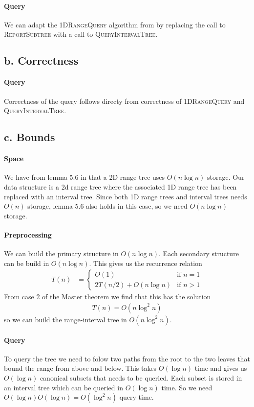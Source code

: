 \documentclass[10pt,a4paper,final,oneside,openany,article,oldfontcommands]{memoir}
\newcommand{\twopartdef}[4] {
  \left\{
    \begin{array}{ll}
      #1 & \mbox{if } #2 \\
      {#3} & \mbox{if } #4
    \end{array}
  \right.
}
\begin{document}
\paragraph{Query}
We can adapt the \textsc{ 1DRangeQuery} algorithm from \cite{deBerg} by replacing the call to \textsc{ ReportSubtree} with a call to \textsc{ QueryIntervalTree}.


\subsection*{b. Correctness}
\paragraph{Query}
Correctness of the query follows directy from correctness of \textsc{ 1DRangeQuery} and \textsc{ QueryIntervalTree}.


\subsection*{c. Bounds}
\paragraph{Space}We have from lemma 5.6 in \cite{deBerg} that a 2D range tree uses $O(n \log n)$ storage. Our data structure is a 2d range tree where the associated 1D range tree has been replaced with an interval tree. Since both 1D range trees and interval trees needs $O(n)$ storage, lemma 5.6 also holds in this case, so we need $O(n \log n)$ storage.

\paragraph{Preprocessing}
We can build the primary structure in $O(n \log n)$. Each secondary structure can be build in $O(n \log n)$. This gives us the recurrence relation
\begin{align*}
  T(n) &= \twopartdef{O(1)}{n = 1}{2T(n/2) + O(n \log n)}{n > 1}
\end{align*}
From case 2 of the Master theorem we find that this has the solution
\begin{align*}
  T(n) = O(n \log^2 n)
\end{align*}
so we can build the range-interval tree in $O(n \log^2 n)$.

\paragraph{Query}
To query the tree we need to folow two paths from the root to the two leaves that bound the range from above and below. This takes $O(\log n)$ time and gives us $O(\log n)$ canonical subsets that needs to be queried. Each subset is stored in an interval tree which can be queried in $O(\log n)$ time. So we need $O(\log n)O(\log n) = O(\log^2 n)$ query time.
\end{document}
